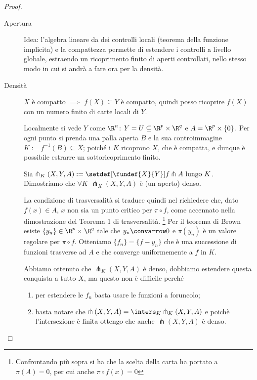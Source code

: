 \begin{proof}~
\begin{description}
\item [Apertura]
Idea: l'algebra lineare da dei controlli locali (teorema della funzione implicita) e la compattezza permette di estendere i controlli a livello globale, estraendo un ricoprimento finito di aperti controllati, nello stesso modo in cui si andrà a fare ora per la densità.
\item [Densità]
$X$ è compatto $\implies$ $f(X) \subseteq Y$ è compatto, quindi posso ricoprire $f(X)$ con un numero finito di carte locali di $Y$.

Localmente si vede $Y$ come $\R^n$: $Y = U \subseteq \R^p \times \R^q$ e $A = \R^p \times \{ 0 \}$. Per ogni punto si prenda una palla aperta $B$ e la sua controimmagine $K := f^{-1}(B) \subseteq X$; poiché i $K$ ricoprono $X$, che è compatta, e dunque è possibile estrarre un sottoricoprimento finito.

Sia $\pitchfork_K(X,Y,A) := \setdef[\fundef{X}{Y}]{f \pitchfork A \text{ lungo } K}$. Dimostriamo che $\forall K$ $\pitchfork_K(X,Y,A)$ è (un aperto) denso. 
\begin{center}
  
\end{center}
La condizione di trasversalità si traduce quindi nel richiedere che, dato $f(x) \in A$, $x$ non sia un punto critico per $\pi \circ f$, come accennato nella dimostrazione del Teorema 1 di trasversalità.
\footnote{Confrontando più sopra si ha che la scelta della carta ha portato a $\pi(A) = 0$, per cui anche $\pi \circ f(x) = 0$}
 Per il teorema di Brown esiste $\{ y_n \} \in \R^p \times \R^q$ tale che $y_n \convarrow 0$ e $\pi (y_n)$ è un valore regolare per $\pi \circ f$. Otteniamo $\{ f_n \} = \{ f - y_n \}$ che è una successione di funzioni trasverse ad $A$ e che converge uniformemente a $f$  in $K$.

Abbiamo ottenuto che $\pitchfork_K(X,Y,A)$ è denso, dobbiamo estendere questa conquista a tutto $X$, ma questo non è difficile perché 
\begin{enumerate}
\item per estendere le $f_n$ basta  usare le funzioni a foruncolo;
\item basta notare che $\pitchfork(X,Y,A) = \inters_K \pitchfork_K(X,Y,A)$ e poichè l'intersezione è finita ottengo che anche $\pitchfork(X,Y,A)$ è denso. \footnotemark
\end{enumerate}
\end{description}


\end{proof}
